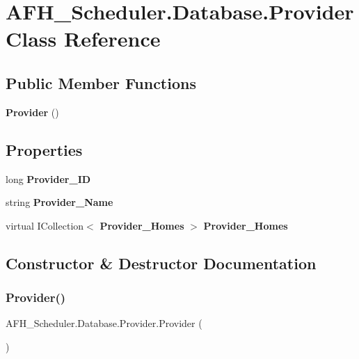 \section{A\+F\+H\+\_\+\+Scheduler.\+Database.\+Provider Class Reference}
\label{class_a_f_h___scheduler_1_1_database_1_1_provider}
\subsection*{Public Member Functions}
\begin{DoxyCompactItemize}
\item 
\textbf{ Provider} ()
\end{DoxyCompactItemize}
\subsection*{Properties}
\begin{DoxyCompactItemize}
\item 
long \textbf{ Provider\+\_\+\+ID}\hspace{0.3cm}{\ttfamily  [get, set]}
\item 
string \textbf{ Provider\+\_\+\+Name}\hspace{0.3cm}{\ttfamily  [get, set]}
\item 
virtual I\+Collection$<$ \textbf{ Provider\+\_\+\+Homes} $>$ \textbf{ Provider\+\_\+\+Homes}\hspace{0.3cm}{\ttfamily  [get, set]}
\end{DoxyCompactItemize}


\subsection{Constructor \& Destructor Documentation}
\mbox{\label{class_a_f_h___scheduler_1_1_database_1_1_provider_a9374300fff0444b7dc3ca3a43073ab00}} 
\subsubsection{Provider()}
{\footnotesize\ttfamily A\+F\+H\+\_\+\+Scheduler.\+Database.\+Provider.\+Provider (\begin{DoxyParamCaption}{ }\end{DoxyParamCaption})}



